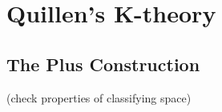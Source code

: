 
















\chapter{Quillen's K-theory}

\section{The Plus Construction}
(check properties of classifying space)

